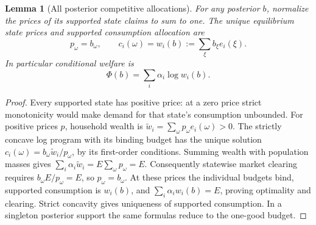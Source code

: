 \documentclass[11pt]{article}
\newtheorem{lemma}[theorem]{Lemma}
\theoremstyle{remark}
\begin{document}
\begin{lemma}[All posterior competitive allocations]
For any posterior $b$, normalize the prices of its supported state claims
to sum to one. The unique equilibrium state prices and supported consumption
allocation are
\[
 p_\omega=b_\omega,\qquad
 c_i(\omega)=w_i(b):=\sum_{\xi}b_\xi e_i(\xi).
\]
In particular conditional welfare is
\[
 \Phi(b)=\sum_i\alpha_i\log w_i(b).
\]
\end{lemma}
\begin{proof}
Every supported state has positive price: at a zero price strict
monotonicity would make demand for that state's consumption unbounded.
For positive prices $p$, household wealth is
$\widetilde w_i=\sum_\omega p_\omega e_i(\omega)>0$.
The strictly concave log program with its binding budget has the unique
solution $c_i(\omega)=b_\omega\widetilde w_i/p_\omega$, by its first-order
conditions. Summing wealth with population masses gives
$\sum_i\alpha_i\widetilde w_i=E\sum_\omega p_\omega=E$.
Consequently statewise market clearing requires
$b_\omega E/p_\omega=E$, so $p_\omega=b_\omega$. At these prices the
individual budgets bind, supported consumption is $w_i(b)$, and
$\sum_i\alpha_i w_i(b)=E$, proving optimality and clearing. Strict
concavity gives uniqueness of supported consumption. In a singleton
posterior support the same formulas reduce to the one-good budget.
\end{proof}
\end{document}
